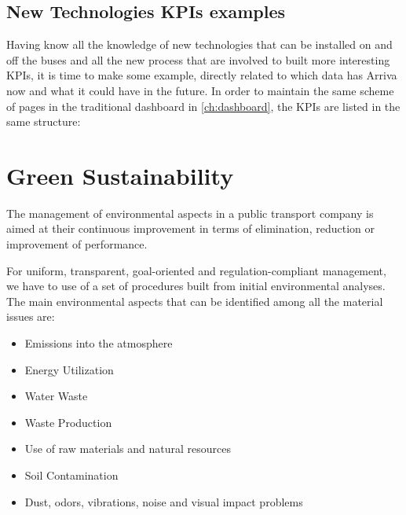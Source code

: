 \newpage
\subsection{New Technologies KPIs examples}
\label{subsec:newKPIex}
Having know all the knowledge of new technologies that can be installed on and off the buses and all the new process that are involved to built more interesting KPIs, it is time to make some example, directly related to which data has Arriva now and what it could have in the future. In order to maintain the same scheme of pages in the traditional dashboard in \ref{ch:dashboard}, the KPIs are listed in the same structure:







\section{Green Sustainability}
\label{sec:greensus}
The management of environmental aspects in a public transport company is aimed at their continuous improvement in terms of elimination, reduction or improvement of performance.

For uniform, transparent, goal-oriented and regulation-compliant management, we have to use of a set of procedures built from initial environmental analyses. The main environmental aspects that can be identified among all the material issues are:
\begin{itemize}
    \item Emissions into the atmosphere
    \item Energy Utilization
    \item Water Waste
    \item Waste Production
    \item Use of raw materials and natural resources
    \item Soil Contamination
    \item Dust, odors, vibrations, noise and visual impact problems
\end{itemize}

